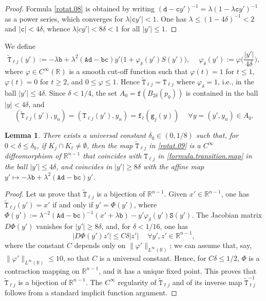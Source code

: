 \documentclass[10pt,reqno,a4paper]{article}
\numberwithin{equation}{section}
\theoremstyle{plain}
\newtheorem{lemma}[theorem]{Lemma}
\theoremstyle{definition}
\newcommand{\R}{{\mathbb R}}
\renewcommand{\d}{\delta}
\newcommand{\ph}{\varphi}
\newcommand{\lm}{\lambda}
\begin{document}
\begin{proof}
Formula \eqref{rotat.08} is obtained by writing $(\mathtt d - \mathtt c y')^{-1} 
= \lm (1 - \lm \mathtt c y')^{-1}$ as a power series, which converges for $\lm |\mathtt c y'| < 1$. 
One has $\lm \leq (1 - 4 \delta)^{-1} < 2$ and $|\mathtt c| < 4 \delta$, 
whence $\lm |c y'| < 8 \delta < 1$ for all $|y'| \leq 1$.  
\end{proof}

We define 
\begin{equation}  \label{rotat.09}
\tilde{\mathtt T}_{\ell j}(y') 
:= - \lm \mathtt b 
+ \lm^2 (\mathtt A \mathtt d - \mathtt b \mathtt c ) y' \big( 1 + \ph_\d(y') S(y') \big), 
\quad \ 
\ph_\d(y') := \ph \Big( \frac{|y'|}{4 \delta} \Big),
\end{equation}
where $\ph \in C^\infty(\R)$ is a smooth cut-off function such that 
$\ph(t) = 1$ for $t \leq 1$, 
$\ph(t) = 0$ for $t \geq 2$, 
and $0 \leq \ph \leq 1$. 
Hence $\tilde{\mathtt T}_{\ell j} = \mathtt T_{\ell j}$ where $\ph_\delta = 1$, 
i.e., in the ball $|y'| \leq 4 \delta$.  
Since $\delta < 1/4$, the set $A_0 = \mathtt f(B_{2\delta}(p_0))$ 
is contained in the ball $|y| < 4\delta$, and  
\begin{equation} \label{extension.in.A0}
(\tilde{\mathtt T}_{\ell j}(y'), y_n) 
= (\mathtt T_{\ell j}(y'), y_n) 
= \mathtt f_\ell (\mathtt g_j(y)) 
\quad \ \forall y = (y', y_n) \in A_0.
\end{equation} 



\begin{lemma}  \label{lemma:rotat.tilde}
There exists a universal constant $\delta_0 \in (0, 1/8)$ such that, 
for $0 < \delta \leq \delta_0$, if $K_j \cap K_\ell \neq \emptyset$, then 
the map $\tilde{\mathtt T}_{\ell j}$ in \eqref{rotat.09}
is a $C^\infty$ diffeomorphism of $\R^{n-1}$ 
that coincides with $\mathtt T_{\ell j}$ in \eqref{formula.transition.map} 
in the ball $|y'| \leq 4 \delta$,
and coincides in $|y'| \geq 8 \delta$ with the affine map 
$y' \mapsto - \lm \mathtt b + \lm^2 (\mathtt A \mathtt d - \mathtt b \mathtt c ) y'$.
\end{lemma}


\begin{proof}
Let us prove that $\tilde{\mathtt T}_{\ell j}$ is a bijection of $\R^{n-1}$. 
Given $x' \in \R^{n-1}$, one has $\tilde{\mathtt T}_{\ell j}(y') = x'$ 
if and only if $y' = \Phi(y')$, where 
$\Phi(y') := \lm^{-2} (\mathtt A \mathtt d - \mathtt b \mathtt c)^{-1} (x' + \lm \mathtt b) 
- y' \ph_\delta(y') \mathtt S(y')$. 
The Jacobian matrix $D \Phi(y')$ vanishes for $|y'| \geq 8 \delta$, 
and, for $\delta < 1/16$, one has
\[
| D \Phi(y') z' | \leq C \delta |z'| \quad \ \forall y', z' \in \R^{n-1}, 
\]
where the constant $C$ depends only on $\| \ph' \|_{L^\infty(\R)}$; 
we can assume that, say, $\| \ph' \|_{L^\infty(\R)} \leq 10$, so that $C$ is a universal constant.
Hence, for $C \delta \leq 1/2$, 
$\Phi$ is a contraction mapping on $\R^{n-1}$, and it has a unique fixed point. 
This proves that $\tilde{\mathtt T}_{\ell j}$ is a bijection of $\R^{n-1}$. 
The $C^\infty$ regularity of $\tilde{\mathtt T}_{\ell j}$ 
and of its inverse map $\tilde{\mathtt T}_{\ell j}^{-1}$ 
follows from a standard implicit function argument. 
\end{proof}
\end{document}
